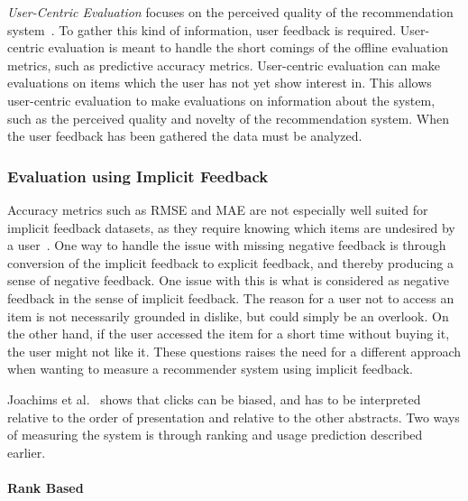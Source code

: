 \textit{User-Centric Evaluation} focuses on the perceived quality of the
recommendation system~\cite{Pu2011}.  To gather this kind of information, user
feedback is required.  User-centric evaluation is meant to handle the short
comings of the offline evaluation metrics, such as predictive accuracy metrics.
User-centric evaluation can make evaluations on items which the user has not
yet show interest in.  This allows user-centric evaluation to make evaluations
on information about the system, such as the perceived quality and novelty of
the recommendation system.  When the user feedback has been gathered the data
must be analyzed.


\subsubsection{Evaluation using Implicit Feedback}

Accuracy metrics such as RMSE and MAE are not especially well suited for
implicit feedback datasets, as they require knowing which items are undesired
by a user~\cite{Hu2008}.  One way to handle the issue with missing negative
feedback is through conversion of the implicit feedback to explicit feedback,
and thereby producing a sense of negative feedback.  One issue with this is
what is considered as negative feedback in the sense of implicit feedback.  The
reason for a user not to access an item is not necessarily grounded in dislike,
but could simply be an overlook.  On the other hand, if the user accessed the
item for a short time without buying it, the user might not like it.  These
questions raises the need for a different approach when wanting to measure a
recommender system using implicit feedback.


Joachims et al.~\cite{Joachims07evaluatingthe} shows that clicks can be biased,
and has to be interpreted relative to the order of presentation and relative to
the other abstracts.  Two ways of measuring the system is through ranking and
usage prediction described earlier.

\paragraph{Rank Based}
\label{par:Ranking_based}

